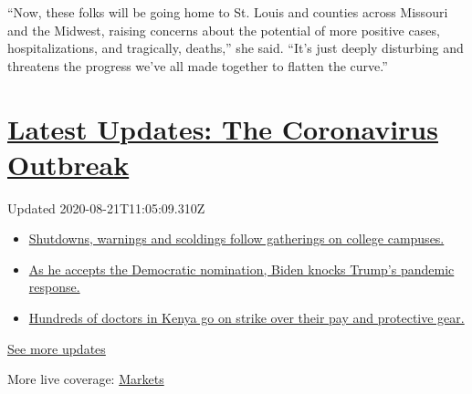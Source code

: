 ``Now, these folks will be going home to St. Louis and counties across
Missouri and the Midwest, raising concerns about the potential of more
positive cases, hospitalizations, and tragically, deaths,'' she said.
``It's just deeply disturbing and threatens the progress we've all made
together to flatten the curve.''

\hypertarget{latest-updates-the-coronavirus-outbreak}{%
\section{\texorpdfstring{\href{https://www.nytimes3xbfgragh.onion/2020/08/21/world/covid-19-coronavirus.html?action=click\&pgtype=Article\&state=default\&region=MAIN_CONTENT_1\&context=storylines_live_updates}{Latest
Updates: The Coronavirus
Outbreak}}{Latest Updates: The Coronavirus Outbreak}}\label{latest-updates-the-coronavirus-outbreak}}

Updated 2020-08-21T11:05:09.310Z

\begin{itemize}
\tightlist
\item
  \href{https://www.nytimes3xbfgragh.onion/2020/08/21/world/covid-19-coronavirus.html?action=click\&pgtype=Article\&state=default\&region=MAIN_CONTENT_1\&context=storylines_live_updates\#link-4690b6aa}{Shutdowns,
  warnings and scoldings follow gatherings on college campuses.}
\item
  \href{https://www.nytimes3xbfgragh.onion/2020/08/21/world/covid-19-coronavirus.html?action=click\&pgtype=Article\&state=default\&region=MAIN_CONTENT_1\&context=storylines_live_updates\#link-324af071}{As
  he accepts the Democratic nomination, Biden knocks Trump's pandemic
  response.}
\item
  \href{https://www.nytimes3xbfgragh.onion/2020/08/21/world/covid-19-coronavirus.html?action=click\&pgtype=Article\&state=default\&region=MAIN_CONTENT_1\&context=storylines_live_updates\#link-35890b73}{Hundreds
  of doctors in Kenya go on strike over their pay and protective gear.}
\end{itemize}

\href{https://www.nytimes3xbfgragh.onion/2020/08/21/world/covid-19-coronavirus.html?action=click\&pgtype=Article\&state=default\&region=MAIN_CONTENT_1\&context=storylines_live_updates}{See
more updates}

More live coverage:
\href{https://www.nytimes3xbfgragh.onion/live/2020/08/20/business/stock-market-today-coronavirus?action=click\&pgtype=Article\&state=default\&region=MAIN_CONTENT_1\&context=storylines_live_updates}{Markets}

